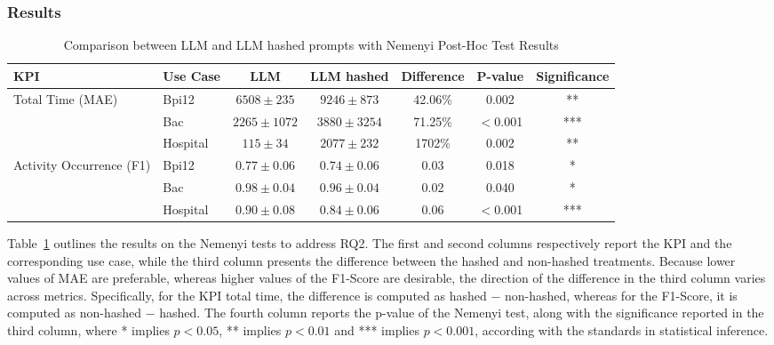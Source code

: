 \documentclass[manuscript,screen,review]{acmart}
\begin{document}








\subsubsection{Results}

\begin{table}[t!]
\centering
\caption{Comparison between LLM and LLM hashed prompts with Nemenyi Post-Hoc Test Results}
\begin{tabular}{l l c c c c c}
\hline
\textbf{KPI} & \textbf{Use Case} & \textbf{LLM} & \textbf{LLM hashed} & \textbf{Difference} & \textbf{P-value} & \textbf{Significance} \\
\hline
\multirow{3}{*}{Total Time (MAE)}
& Bpi12 & $6508 \pm 235$ & $9246 \pm 873$ & 42.06\% & 0.002 & ** \\
& Bac & $2265 \pm 1072$ & $3880 \pm 3254$ & 71.25\% & $<$0.001 & *** \\
& Hospital & $115 \pm 34$ & $2077 \pm 232$ & 1702\% & 0.002 & ** \\
\hline
\multirow{3}{*}{Activity Occurrence (F1)}
& Bpi12 & $0.77 \pm 0.06$ & $0.74 \pm 0.06$ & 0.03 & 0.018 & * \\
& Bac & $0.98 \pm 0.04$ & $0.96 \pm 0.04$ & 0.02 & 0.040 & * \\
& Hospital & $0.90 \pm 0.08$ & $0.84 \pm 0.06$ & 0.06 & $<$0.001 & *** \\
\hline
\end{tabular}
\label{tab:nemenyi_summary}
\end{table}


Table~\ref{tab:nemenyi_summary} outlines the results on the Nemenyi tests to address RQ2. The first and second columns respectively report the KPI and the corresponding use case, while the third column presents the difference between the hashed and non-hashed treatments. Because lower values of MAE are preferable, whereas higher values of the F1-Score are desirable, the direction of the difference in the third column varies across metrics. Specifically, for the KPI total time, the difference is computed as hashed $-$ non-hashed, whereas for the F1-Score, it is computed as non-hashed $-$ hashed. The fourth column reports the p-value of the Nemenyi test, along with the significance reported in the third column, where * implies $p<0.05$, ** implies $p<0.01$ and *** implies $p<0.001$, according with the standards in statistical inference.
\end{document}
